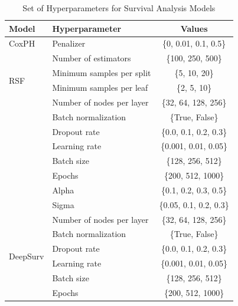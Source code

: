 \begin{table}[htbp]
\centering
\scriptsize
\setlength{\tabcolsep}{4pt}
\caption{Set of Hyperparameters for Survival Analysis Models}
\begin{tabular}{l l c}
\hline
\textbf{Model}         & \textbf{Hyperparameter}             & \textbf{Values} \\ \hline
\multirow{1}{*}{CoxPH} & Penalizer                         & \{0, 0.01, 0.1, 0.5\} \\ \hline
\multirow{4}{*}{RSF}   & Number of estimators                & \{100, 250, 500\}   \\
                       & Minimum samples per split           & \{5, 10, 20\}       \\
                       & Minimum samples per leaf            & \{2, 5, 10\}        \\ \hline
\multirow{8}{*}{DeepHit} 
                       & Number of nodes per layer           & \{32, 64, 128, 256\} \\
                       & Batch normalization                 & \{True, False\}       \\
                       & Dropout rate                        & \{0.0, 0.1, 0.2, 0.3\} \\
                       & Learning rate                       & \{0.001, 0.01, 0.05\} \\
                       & Batch size                          & \{128, 256, 512\}    \\
                       & Epochs                              & \{200, 512, 1000\}   \\
                       & Alpha                               & \{0.1, 0.2, 0.3, 0.5\} \\
                       & Sigma                               & \{0.05, 0.1, 0.2, 0.3\} \\ \hline
\multirow{6}{*}{DeepSurv} 
                       & Number of nodes per layer           & \{32, 64, 128, 256\} \\
                       & Batch normalization                 & \{True, False\}       \\
                       & Dropout rate                        & \{0.0, 0.1, 0.2, 0.3\} \\
                       & Learning rate                       & \{0.001, 0.01, 0.05\} \\
                       & Batch size                          & \{128, 256, 512\}    \\
                       & Epochs                              & \{200, 512, 1000\}   \\ \hline
\end{tabular}
\end{table}